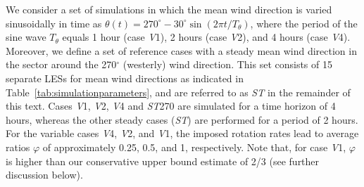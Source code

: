 		We consider a set of simulations in which the mean wind direction is varied sinusoidally in time as $\theta(t) = 270^\circ - 30^\circ
		\sin(2\pi t/T_\theta)$, where the period of the sine wave $T_\theta$ equals 1 hour (case \emph{V}1), 2 hours (case \emph{V}2), and 4 hours (case \emph{V}4). Moreover, we define a set of reference cases with a steady mean wind direction in the sector around the 270$^\circ$ (westerly) wind direction. This set consists of 15 separate LESs for mean wind directions as indicated in Table~\ref{tab:simulationparameters}, and are referred to as \emph{ST} in the remainder of this text. Cases \emph{V}1, \emph{V}2, \emph{V}4 and \emph{ST}270 are simulated for a time horizon of 4 hours, whereas the other steady cases (\emph{ST}) are performed for a period of 2 hours. For the variable cases \emph{V}4, \emph{V}2, and \emph{V}1, the imposed rotation rates lead to average ratios $\varphi$ of approximately 0.25, 0.5, and 1, respectively. Note that, for case \emph{V}1, $\varphi$ is higher than our conservative upper bound estimate of 2/3 (see further discussion below).
		
